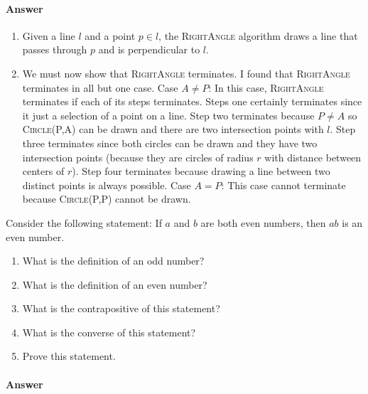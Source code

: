 \documentclass{article}
\begin{document}
\paragraph{Answer}


\begin{enumerate}
    \item Given a line $l$ and a point $p \in l$, the \textsc{RightAngle} algorithm draws a line that passes through $p$ and is perpendicular to $l$.
    \item We must now show that \textsc{RightAngle} terminates.
    I found that \textsc{RightAngle} terminates in all but one case. \parspace
    Case $A \neq P$: In this case, \textsc{RightAngle} terminates if each of its steps terminates.
    Steps one certainly terminates since it just a selection of a point on a line.
    Step two terminates because $P \neq A$ so \textsc{Circle(P,A)} can be drawn and there are two intersection points with $l$.
    Step three terminates since both circles can be drawn and they have two intersection points (because they are circles of radius $r$ with distance between centers of $r$).
    Step four terminates because drawing a line between two distinct points is always possible. \parspace
    Case $A = P$: This case cannot terminate because \textsc{Circle(P,P)} cannot be drawn.
\end{enumerate}




\nextprob
Consider the following statement: If $a$ and $b$ are both even numbers, then $ab$ is
an even number.
\begin{enumerate}
    \item What is the definition of an odd number?
    \item What is the definition of an even number?
    \item What is the contrapositive of this statement?
    \item What is the converse of this statement?
    \item Prove this statement.
\end{enumerate}

\paragraph{Answer}

\end{document}

